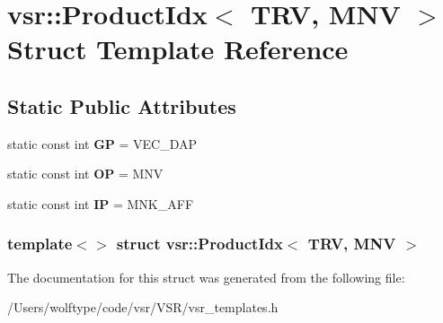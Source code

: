 \hypertarget{structvsr_1_1_product_idx_3_01_t_r_v_00_01_m_n_v_01_4}{\section{vsr\-:\-:Product\-Idx$<$ T\-R\-V, M\-N\-V $>$ Struct Template Reference}
\label{structvsr_1_1_product_idx_3_01_t_r_v_00_01_m_n_v_01_4}
}
\subsection*{Static Public Attributes}
\begin{DoxyCompactItemize}
\item 
\hypertarget{structvsr_1_1_product_idx_3_01_t_r_v_00_01_m_n_v_01_4_a7edf4e7f85092ae7478bf9f92ca94c75}{static const int {\bfseries G\-P} = V\-E\-C\-\_\-\-D\-A\-P}\label{structvsr_1_1_product_idx_3_01_t_r_v_00_01_m_n_v_01_4_a7edf4e7f85092ae7478bf9f92ca94c75}

\item 
\hypertarget{structvsr_1_1_product_idx_3_01_t_r_v_00_01_m_n_v_01_4_a728406131b12c7235b1d93eea4b7e309}{static const int {\bfseries O\-P} = M\-N\-V}\label{structvsr_1_1_product_idx_3_01_t_r_v_00_01_m_n_v_01_4_a728406131b12c7235b1d93eea4b7e309}

\item 
\hypertarget{structvsr_1_1_product_idx_3_01_t_r_v_00_01_m_n_v_01_4_a69d6b4657a988f6c010a1a98a4c9528f}{static const int {\bfseries I\-P} = M\-N\-K\-\_\-\-A\-F\-F}\label{structvsr_1_1_product_idx_3_01_t_r_v_00_01_m_n_v_01_4_a69d6b4657a988f6c010a1a98a4c9528f}

\end{DoxyCompactItemize}
\subsubsection*{template$<$$>$ struct vsr\-::\-Product\-Idx$<$ T\-R\-V, M\-N\-V $>$}



The documentation for this struct was generated from the following file\-:\begin{DoxyCompactItemize}
\item 
/\-Users/wolftype/code/vsr/\-V\-S\-R/vsr\-\_\-templates.\-h\end{DoxyCompactItemize}
